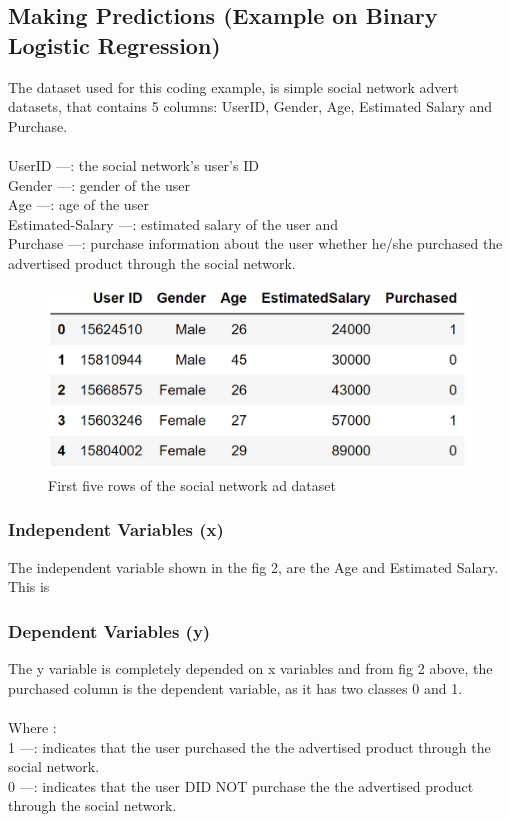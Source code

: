 \documentclass[conference]{IEEEtran}
\begin{document}
\subsection{Making Predictions (Example on Binary Logistic Regression)}
The dataset used for this coding example, is simple social network advert datasets, that contains 5 columns: UserID, Gender, Age, Estimated Salary and Purchase.\\
\\
UserID —: the social network's user's ID\\
Gender —: gender of the user\\
Age —: age of the user\\
Estimated-Salary —: estimated salary of the user and\\
Purchase —: purchase information about the user whether he/she purchased the advertised product through the social network.

\begin{figure}[h]
    \centering
    \includegraphics[scale=0.34]{figs/socialDataset.png}
    \caption{First five rows of the social network ad dataset}
    \label{dabc}        
\end{figure}


\subsubsection{Independent Variables (x)}
The independent variable shown in the fig 2, are the Age and Estimated Salary. This is 

\subsubsection{Dependent Variables (y)}
The y variable is completely depended on x variables and from fig 2 above, the purchased column is the dependent variable, as it has two classes 0 and 1.\\
\\
Where :\\
1 —: indicates that the user purchased the the advertised product through the social network.\\
0 —: indicates that the user DID NOT purchase the the advertised product through the social network.\\
\end{document}
